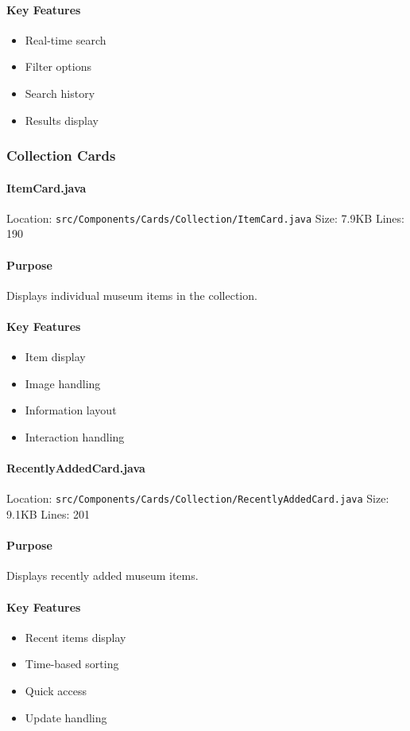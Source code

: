 \documentclass[12pt,a4paper]{article}
\begin{document}
\paragraph{Key Features}
\begin{itemize}
    \item Real-time search
    \item Filter options
    \item Search history
    \item Results display
\end{itemize}

\subsubsection{Collection Cards}
\paragraph{ItemCard.java}
Location: \texttt{src/Components/Cards/Collection/ItemCard.java}
Size: 7.9KB
Lines: 190

\paragraph{Purpose}
Displays individual museum items in the collection.

\paragraph{Key Features}
\begin{itemize}
    \item Item display
    \item Image handling
    \item Information layout
    \item Interaction handling
\end{itemize}

\paragraph{RecentlyAddedCard.java}
Location: \texttt{src/Components/Cards/Collection/RecentlyAddedCard.java}
Size: 9.1KB
Lines: 201

\paragraph{Purpose}
Displays recently added museum items.

\paragraph{Key Features}
\begin{itemize}
    \item Recent items display
    \item Time-based sorting
    \item Quick access
    \item Update handling
\end{itemize}
\end{document}
